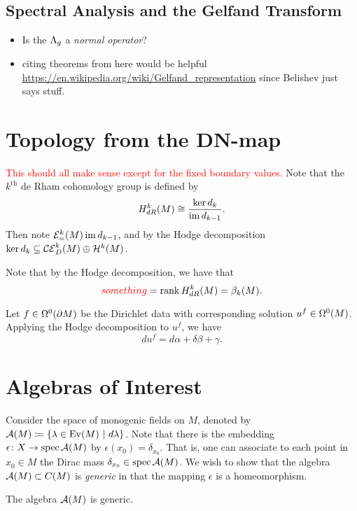 \documentclass[12pt]{article}
\begin{document}
\subsection{Spectral Analysis and the Gelfand Transform}

\begin{itemize}
	\item Is the $\dnmap$ a \emph{normal operator}? 
	\item citing theorems from here would be helpful \url{https://en.wikipedia.org/wiki/Gelfand_representation} since Belishev just says stuff.
\end{itemize}

\section{Topology from the DN-map}

\textcolor{red}{This should all make sense except for the fixed boundary values.}
Note that the $k^\textrm{th}$ de Rham cohomology group is defined by
\[
H^k_{dR}(M) \cong \frac{\ker d_k}{\im d_{k-1}}.
\]
Then note $\exact{k}=\im d_{k-1}$, and by the Hodge decomposition $\ker d_k \subseteq \coexact{k}{D}\oplus \harmonic{k}{}$.

Note that by the Hodge decomposition, we have that
\[
\textcolor{red}{something} =\operatorname{rank} H^k_{dR}(M) = \beta_k(M).
\]


Let $f\in \boundarykforms{0}$ be the Dirichlet data with corresponding solution $u^f \in \kforms{0}{}$.  Applying the Hodge decomposition to $u^f$, we have
\[
du^f = d\alpha + \delta \beta + \gamma.
\] 


\section{Algebras of Interest}

Consider the space of monogenic fields on $M$, denoted by $\monogenics \coloneqq \{\lambda \in \evens ~\vert~ d\lambda \}$. Note that there is the embedding $\epsilon \colon X \to \spec \monogenics$ by $\epsilon(x_0)=\delta_{x_0}$.  That is, one can associate to each point in $x_0\in M$ the Dirac mass $\delta_{x_0}\in \spec \monogenics$.   We wish to show that the algebra $\monogenics \subset C(M)$ is \emph{generic} in that the mapping $\epsilon$ is a homeomorphism. 

\begin{lemma}
The algebra $\monogenics$ is generic.
\end{lemma}
\end{document}
